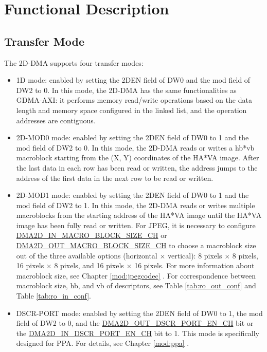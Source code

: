 \documentclass[main\_\_EN.tex]{subfiles}
\begin{document}

\section{Functional Description}
\label{sec:2ddma-func-descr}

\subsection{Transfer Mode}

The 2D-DMA supports four transfer modes:

\begin{itemize}
    \item 1D mode: enabled by setting the 2DEN field of DW0 and the mod field of DW2 to 0. In this mode, the 2D-DMA has the same functionalities as GDMA-AXI: it performs memory read/write operations based on the data length and memory space configured in the linked list, and the operation addresses are contiguous.
    \item 2D-MOD0 mode: enabled by setting the 2DEN field of DW0 to 1 and the mod field of DW2 to 0. In this mode, the 2D-DMA reads or writes a hb*vb macroblock starting from the (X, Y) coordinates of the HA*VA image. After the last data in each row has been read or written, the address jumps to the address of the first data in the next row to be read or written.
    \item 2D-MOD1 mode: enabled by setting the 2DEN field of DW0 to 1 and the mod field of DW2 to 1. In this mode, the 2D-DMA reads or writes multiple macroblocks from the starting address of the HA*VA image until the HA*VA image has been fully read or written. For JPEG, it is necessary to configure \hyperref[fielddesc:DMA2DINMACROBLOCKSIZECHN]{DMA2D\_IN\_MACRO\_BLOCK\_SIZE\_CH} or \hyperref[fielddesc:DMA2DOUTMACROBLOCKSIZECHN]{DMA2D\_OUT\_MACRO\_BLOCK\_SIZE\_CH} to choose a macroblock size out of the three available options (horizontal $\times$ vertical): 8 pixels $\times$ 8 pixels, 16 pixels $\times$ 8 pixels, and 16 pixels $\times$ 16 pixels. For more information about macroblock size, see Chapter \ref{mod:jpegcodec} \textit{}. For correspondence between macroblock size, hb, and vb of descriptors, see Table \ref{tab:ro_out_conf} and Table \ref{tab:ro_in_conf}.
    \item DSCR-PORT mode: enabled by setting the 2DEN field of DW0 to 1, the mod field of DW2 to 0, and the \hyperref[fielddesc:DMA2DOUTDSCRPORTENCHN]{DMA2D\_OUT\_DSCR\_PORT\_EN\_CH} bit or the \hyperref[fielddesc:DMA2DINDSCRPORTENCHN]{DMA2D\_IN\_DSCR\_PORT\_EN\_CH} bit to 1. This mode is specifically designed for PPA. For details, see Chapter \ref{mod:ppa} \textit{}.
\end{itemize}
\end{document}
